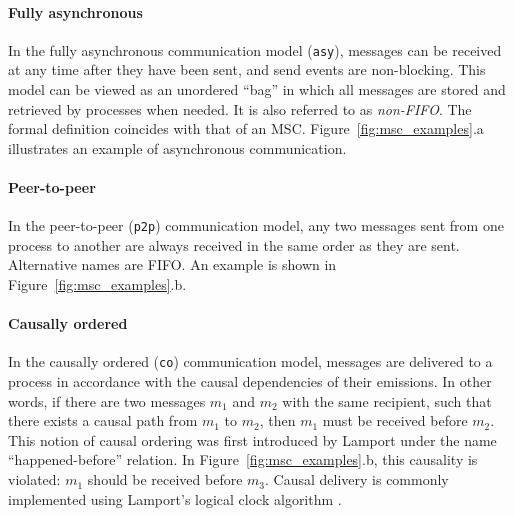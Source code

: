 \paragraph{Fully asynchronous}

In the fully asynchronous communication model (\verb|asy|), messages can be 
received at any time after they have been sent, and send events are 
non-blocking. This model can be viewed as an unordered ``bag'' in which 
all messages are stored and retrieved by processes when needed. It is also 
referred to as \emph{non-FIFO}. The formal definition coincides with that of 
an MSC. Figure~\ref{fig:msc_examples}.a illustrates an example of asynchronous 
communication.

\paragraph{Peer-to-peer} 
In the peer-to-peer (\verb|p2p|) communication model, any two messages sent from one 
process to another are always received in the same order as they are sent.
Alternative names are FIFO. An example is shown in Figure~\ref{fig:msc_examples}.b.


\paragraph{Causally ordered}
In the causally ordered (\verb|co|) communication model, messages are delivered 
to a process in accordance with the causal dependencies of their emissions. 
In other words, if there are two messages $m_1$ and $m_2$ with the same recipient, 
such that there exists a causal path from $m_1$ to $m_2$, then $m_1$ must be received 
before $m_2$. This notion of causal ordering was first introduced by Lamport under the 
name ``happened-before'' relation. In Figure~\ref{fig:msc_examples}.b, this 
causality is violated: $m_1$ should be received before $m_3$. Causal delivery 
is commonly implemented using Lamport's logical clock algorithm \cite{lamport2019time}.


